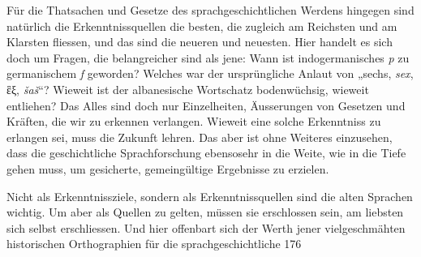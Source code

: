 {Für die  Thatsachen und Gesetze des sprachgeschichtlichen Werdens hingegen sind natürlich die Erkenntnissquellen die besten, die zugleich am Reichsten und am Klarsten fliessen, und das sind die neueren und neuesten. Hier handelt es sich doch um Fragen, die belangreicher sind als jene: Wann ist indogermanisches \textit{p} zu germanischem \textit{f} geworden? Welches war der ursprüngliche Anlaut von „sechs, \textit{sex}, ἓξ, \textit{šaš}“? Wieweit ist der albanesische Wortschatz bodenwüchsig, wieweit entliehen? Das Alles sind doch nur Einzelheiten, Äusserungen von Gesetzen und Kräften, die wir zu erkennen verlangen. Wieweit eine solche Erkenntniss zu erlangen sei, muss die Zukunft lehren. Das aber ist ohne Weiteres einzusehen, dass die geschichtliche Sprachforschung ebensosehr in die Weite, wie in die Tiefe gehen muss, um gesicherte, gemeingültige Ergebnisse zu erzielen.

\begin{sloppypar}Nicht als Erkenntnissziele, sondern als Erkenntnissquellen sind die alten Sprachen wichtig. Um aber als Quellen zu gelten, müssen sie erschlossen sein, am liebsten sich selbst erschliessen. Und hier offenbart sich der Werth jener viel\-geschmähten historischen Orthographien für die sprachgeschichtliche  176{\textbar}{\textbar}\label{sp.176}\end{sloppypar}

}
